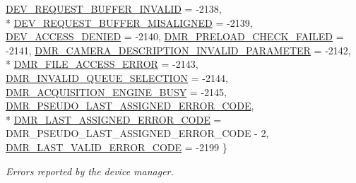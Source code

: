 \begin{DoxyCompactItemize}
\hyperlink{group___common_interface_gga112225e5fbaaaef6445ff4ebf98f8e03a471a91cf378a66e3c8fb2b398250fffc}{D\+E\+V\+\_\+\+R\+E\+Q\+U\+E\+S\+T\+\_\+\+B\+U\+F\+F\+E\+R\+\_\+\+I\+N\+V\+A\+L\+I\+D} = -\/2138, 
\\*
\hyperlink{group___common_interface_gga112225e5fbaaaef6445ff4ebf98f8e03afa11e7ddf98c8b92e3ed4a0325d322c5}{D\+E\+V\+\_\+\+R\+E\+Q\+U\+E\+S\+T\+\_\+\+B\+U\+F\+F\+E\+R\+\_\+\+M\+I\+S\+A\+L\+I\+G\+N\+E\+D} = -\/2139, 
\hyperlink{group___common_interface_gga112225e5fbaaaef6445ff4ebf98f8e03a8be3780ba3e27b29b95e565a370907b1}{D\+E\+V\+\_\+\+A\+C\+C\+E\+S\+S\+\_\+\+D\+E\+N\+I\+E\+D} = -\/2140, 
\hyperlink{group___common_interface_gga112225e5fbaaaef6445ff4ebf98f8e03ae1d6e436c68fecce5ff0ebeeb675cec0}{D\+M\+R\+\_\+\+P\+R\+E\+L\+O\+A\+D\+\_\+\+C\+H\+E\+C\+K\+\_\+\+F\+A\+I\+L\+E\+D} = -\/2141, 
\hyperlink{group___common_interface_gga112225e5fbaaaef6445ff4ebf98f8e03ad6233be0e1bf6428941d2037c1f52e60}{D\+M\+R\+\_\+\+C\+A\+M\+E\+R\+A\+\_\+\+D\+E\+S\+C\+R\+I\+P\+T\+I\+O\+N\+\_\+\+I\+N\+V\+A\+L\+I\+D\+\_\+\+P\+A\+R\+A\+M\+E\+T\+E\+R} = -\/2142, 
\\*
\hyperlink{group___common_interface_gga112225e5fbaaaef6445ff4ebf98f8e03aa07319d0a8576389db46e6daf58dfe8f}{D\+M\+R\+\_\+\+F\+I\+L\+E\+\_\+\+A\+C\+C\+E\+S\+S\+\_\+\+E\+R\+R\+O\+R} = -\/2143, 
\hyperlink{group___common_interface_gga112225e5fbaaaef6445ff4ebf98f8e03a22a8a42c127ea2fe5774d48218199562}{D\+M\+R\+\_\+\+I\+N\+V\+A\+L\+I\+D\+\_\+\+Q\+U\+E\+U\+E\+\_\+\+S\+E\+L\+E\+C\+T\+I\+O\+N} = -\/2144, 
\hyperlink{group___common_interface_gga112225e5fbaaaef6445ff4ebf98f8e03a6460e5f2bb8430af27e29c42327b3608}{D\+M\+R\+\_\+\+A\+C\+Q\+U\+I\+S\+I\+T\+I\+O\+N\+\_\+\+E\+N\+G\+I\+N\+E\+\_\+\+B\+U\+S\+Y} = -\/2145, 
\hyperlink{group___common_interface_gga112225e5fbaaaef6445ff4ebf98f8e03a4d3dba332bf401d3b34089a56fc9d0d4}{D\+M\+R\+\_\+\+P\+S\+E\+U\+D\+O\+\_\+\+L\+A\+S\+T\+\_\+\+A\+S\+S\+I\+G\+N\+E\+D\+\_\+\+E\+R\+R\+O\+R\+\_\+\+C\+O\+D\+E}, 
\\*
\hyperlink{group___common_interface_gga112225e5fbaaaef6445ff4ebf98f8e03a45ad85dffde3a952948bb8ee2f52f4c4}{D\+M\+R\+\_\+\+L\+A\+S\+T\+\_\+\+A\+S\+S\+I\+G\+N\+E\+D\+\_\+\+E\+R\+R\+O\+R\+\_\+\+C\+O\+D\+E} = D\+M\+R\+\_\+\+P\+S\+E\+U\+D\+O\+\_\+\+L\+A\+S\+T\+\_\+\+A\+S\+S\+I\+G\+N\+E\+D\+\_\+\+E\+R\+R\+O\+R\+\_\+\+C\+O\+D\+E -\/ 2, 
\hyperlink{group___common_interface_gga112225e5fbaaaef6445ff4ebf98f8e03a15a98b2bf73780a3635b1205686408bb}{D\+M\+R\+\_\+\+L\+A\+S\+T\+\_\+\+V\+A\+L\+I\+D\+\_\+\+E\+R\+R\+O\+R\+\_\+\+C\+O\+D\+E} = -\/2199
 \}
\begin{DoxyCompactList}\small\item\em Errors reported by the device manager. \end{DoxyCompactList}\item 

\end{DoxyCompactItemize}
